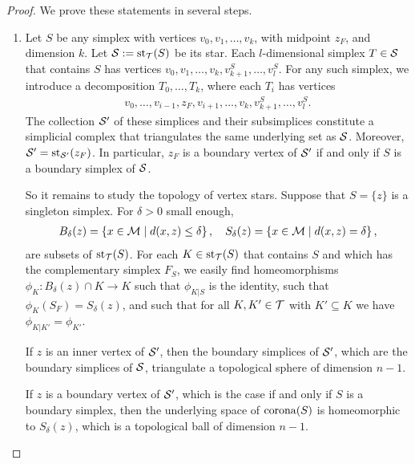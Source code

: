 \documentclass[12pt,a4paper]{article}
\begin{document}
\begin{proof}
    We prove these statements in several steps.
    \begin{enumerate}
    \item 
    Let $S$ be any simplex with vertices $v_0, v_1, \dots, v_k$, with midpoint $z_F$, and dimension $k$.
    Let ${\mathcal S} := \operatorname{st}_{{\mathcal T}}(S)$ be its star. 
    Each $l$-dimensional simplex $T \in {\mathcal S}$ that contains $S$ 
    has vertices $v_0, v_1, \dots, v_k, v_{k+1}^{S}, \dots, v_{l}^{S}$. 
    For any such simplex, we introduce a decomposition $T_{0}, \dots, T_{k}$, where each $T_{i}$ has vertices 
    \begin{align*}
        v_0, \dots, v_{i-1}, z_F, v_{i+1}, \dots, v_k, v_{k+1}^{S}, \dots, v_{l}^{S}.
    \end{align*}
    The collection ${\mathcal S}'$ of these simplices and their subsimplices constitute a simplicial complex 
    that triangulates the same underlying set as ${\mathcal S}$.
    Moreover, ${\mathcal S}' = \operatorname{st}_{{\mathcal S}'}(z_F)$. 
    In particular, $z_F$ is a boundary vertex of ${\mathcal S}'$ if and only if $S$ is a boundary simplex of ${\mathcal S}$. 
    
    So it remains to study the topology of vertex stars. Suppose that $S = \{z\}$ is a singleton simplex. 
    For $\delta > 0$ small enough, 
    \begin{align*}
        B_{\delta}(z) = \left\{ x \in \calM \suchthat d(x,z) \leq \delta \right\},
        \quad 
        S_{\delta}(z) = \left\{ x \in \calM \suchthat d(x,z) = \delta \right\},
    \end{align*}
    are subsets of $\operatorname{st}_{{\mathcal T}}(S)$.
    For each $K \in \operatorname{st}_{{\mathcal T}}(S)$ that contains $S$ and which has the complementary simplex $F_S$, 
    we easily find homeomorphisms $\phi_{K} : B_{\delta}(z) \cap K \rightarrow K$
    such that 
    $\phi_{K|S}$ is the identity,
    such that 
    $\phi_{K}(S_F) = S_{\delta}(z)$,
    and such that 
    for all $K, K' \in {\mathcal T}$ with $K' \subseteq K$ we have $\phi_{K|K'} = \phi_{K'}$. 
    
    If $z$ is an inner vertex of ${\mathcal S}'$, 
    then the boundary simplices of ${\mathcal S}'$,
    which are the boundary simplices of ${\mathcal S}$, triangulate a topological sphere of dimension $n-1$.
    
    If $z$ is a boundary vertex of ${\mathcal S}'$,
    which is the case if and only if $S$ is a boundary simplex, 
    then the underlying space of $\operatorname*{{\rm corona}}(S)$ is homeomorphic to $S_{\delta}(z)$, 
    which is a topological ball of dimension $n-1$. %
    

\end{enumerate}
\end{proof}
\end{document}
